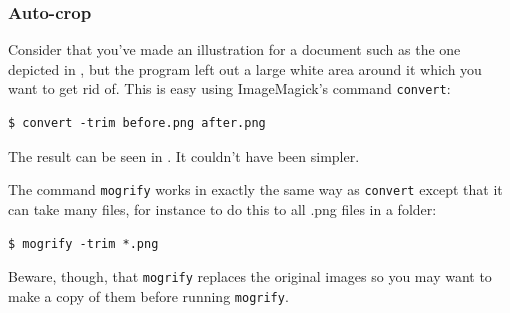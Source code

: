 \subsubsection{Auto-crop}
Consider that you've made an illustration for a document such as the one depicted in , but the program left out a large white area around it which you want to get rid of. This is easy using ImageMagick's command \verb|convert|:

\begin{verbatim}
$ convert -trim before.png after.png
\end{verbatim}
The result can be seen in . It couldn't have been simpler.

The command \verb|mogrify| works in exactly the same way as \verb|convert| except that it can take many files, for instance to do this to all .png files in a folder:

\begin{verbatim}
$ mogrify -trim *.png
\end{verbatim}
Beware, though, that \verb|mogrify| replaces the original images so you may want to make a copy of them before running \verb|mogrify|.

